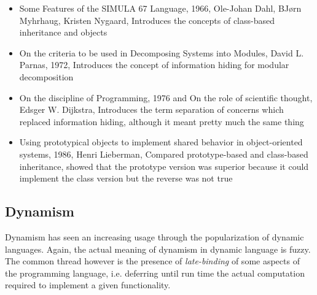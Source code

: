 \begin{itemize}
    \item Some Features of the SIMULA 67 Language, 1966, Ole-Johan Dahl, BJørn
        Myhrhaug, Kristen Nygaard, Introduces the concepts of class-based
        inheritance and objects
    \item On the criteria to be used in Decomposing Systems into Modules, David
        L. Parnas, 1972, Introduces the concept of information hiding for
        modular decomposition
    \item On the discipline of Programming, 1976 and On the role of scientific
        thought, Edsger W. Dijkstra, Introduces the term separation of concerns
        which replaced information hiding, although it meant pretty much the
        same thing
    \item Using prototypical objects to implement shared behavior in
        object-oriented systems, 1986, Henri Lieberman, Compared prototype-based
        and class-based inheritance, showed that the prototype version was
        superior because it could implement the class version but the reverse
        was not true
\end{itemize}


\subsection{Dynamism}

Dynamism has seen an increasing usage through the popularization of dynamic
languages. Again, the actual meaning of dynamism in dynamic language is
fuzzy. The common thread however is the presence of \textit{late-binding} of
some aspects of the programming language, i.e. deferring until run time the
actual computation required to implement a given functionality.

